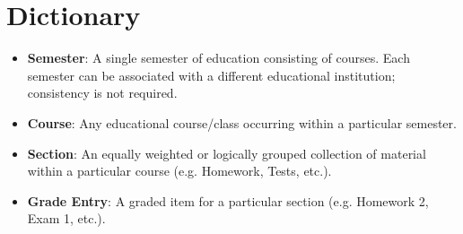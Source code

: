 \documentclass[12pt]{article}
\begin{document}
\section{Dictionary}
\begin{itemize}
    \item \textbf{Semester}: A single semester of education consisting of courses. Each semester can
    be associated with a different educational institution; consistency is not required.
    \item \textbf{Course}: Any educational course/class occurring within a particular semester.
    \item \textbf{Section}: An equally weighted or logically grouped collection of material within a
    particular course (e.g. Homework, Tests, etc.).
    \item \textbf{Grade Entry}: A graded item for a particular section (e.g. Homework 2, Exam 1,
    etc.).
\end{itemize}



\end{document}
